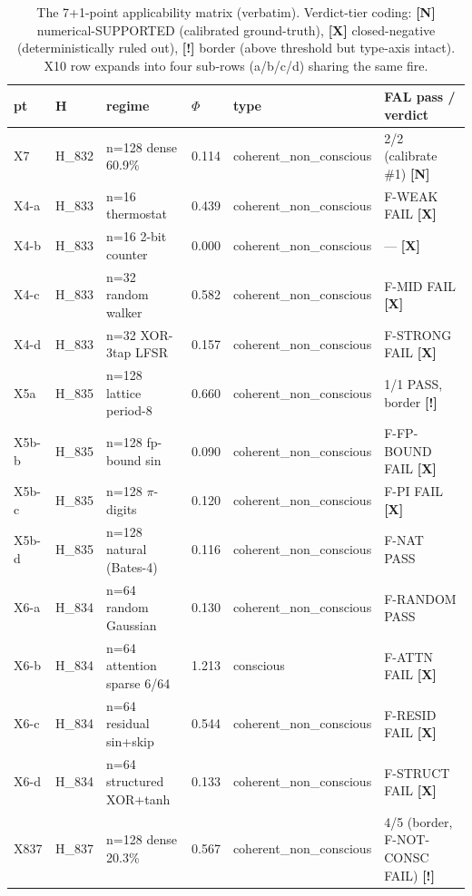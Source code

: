 \documentclass[11pt,a4paper]{article}
\providecommand{\tierGreen}{\textbf{[N]}}   %
\providecommand{\tierRed}{\textbf{[X]}}     %
\providecommand{\tierYellow}{\textbf{[!]}}  %
\begin{document}
\begin{table}[h]
\centering
\small
\caption{The 7+1-point applicability matrix (verbatim).
Verdict-tier coding: \tierGreen{} numerical-SUPPORTED (calibrated
ground-truth), \tierRed{} closed-negative (deterministically ruled out),
\tierYellow{} border (above threshold but type-axis intact). X10 row
expands into four sub-rows (a/b/c/d) sharing the same fire.}
\label{tab:verdict}
\begin{tabular}{@{}llllll@{}}
\toprule
\textbf{pt} & \textbf{H} & \textbf{regime} & \textbf{$\Phi$} &
\textbf{type} & \textbf{FAL pass / verdict} \\
\midrule
X7   & H\_832 & n=128 dense 60.9\%    & 0.114
     & coherent\_non\_conscious
     & 2/2 (calibrate \#1) \tierGreen \\
X4-a & H\_833 & n=16 thermostat
     & 0.439 & coherent\_non\_conscious & F-WEAK FAIL \tierRed \\
X4-b & H\_833 & n=16 2-bit counter
     & 0.000 & coherent\_non\_conscious & --- \tierRed \\
X4-c & H\_833 & n=32 random walker
     & 0.582 & coherent\_non\_conscious & F-MID FAIL \tierRed \\
X4-d & H\_833 & n=32 XOR-3tap LFSR
     & 0.157 & coherent\_non\_conscious & F-STRONG FAIL \tierRed \\
X5a  & H\_835 & n=128 lattice period-8 & 0.660
     & coherent\_non\_conscious & 1/1 PASS, border \tierYellow \\
X5b-b & H\_835 & n=128 fp-bound sin & 0.090
     & coherent\_non\_conscious & F-FP-BOUND FAIL \tierRed \\
X5b-c & H\_835 & n=128 $\pi$-digits
     & 0.120 & coherent\_non\_conscious & F-PI FAIL \tierRed \\
X5b-d & H\_835 & n=128 natural (Bates-4) & 0.116
     & coherent\_non\_conscious & F-NAT PASS \\
X6-a & H\_834 & n=64 random Gaussian & 0.130
     & coherent\_non\_conscious & F-RANDOM PASS \\
X6-b & H\_834 & n=64 attention sparse 6/64
     & 1.213 & conscious & F-ATTN FAIL \tierRed \\
X6-c & H\_834 & n=64 residual sin+skip
     & 0.544 & coherent\_non\_conscious & F-RESID FAIL \tierRed \\
X6-d & H\_834 & n=64 structured XOR+tanh
     & 0.133 & coherent\_non\_conscious & F-STRUCT FAIL \tierRed \\
X837 & H\_837 & n=128 dense 20.3\%    & 0.567
     & coherent\_non\_conscious
     & 4/5 (border, F-NOT-CONSC FAIL) \tierYellow \\

\end{tabular}
\end{table}
\end{document}
